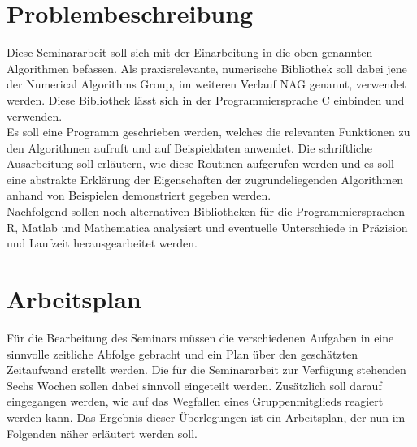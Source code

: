 \documentclass{article}
\begin{document}
\section{Problembeschreibung}
Diese Seminararbeit soll sich mit der Einarbeitung in die oben genannten Algorithmen befassen.
Als praxisrelevante, numerische Bibliothek soll dabei jene der Numerical Algorithms Group, im weiteren Verlauf NAG genannt, verwendet werden. Diese Bibliothek lässt sich in der Programmiersprache C einbinden und verwenden.\\
Es soll eine Programm geschrieben werden, welches die relevanten Funktionen zu den Algorithmen aufruft und auf Beispieldaten anwendet. Die schriftliche Ausarbeitung soll erläutern, wie diese Routinen aufgerufen werden und es soll eine abstrakte Erklärung der Eigenschaften der zugrundeliegenden Algorithmen anhand von Beispielen demonstriert gegeben werden.\\
Nachfolgend sollen noch alternativen Bibliotheken für die Programmiersprachen R, Matlab und Mathematica analysiert und eventuelle Unterschiede in Präzision und Laufzeit herausgearbeitet werden.

\section{Arbeitsplan}
Für die Bearbeitung des Seminars müssen die verschiedenen Aufgaben in eine sinnvolle zeitliche Abfolge gebracht und ein Plan über den geschätzten Zeitaufwand erstellt werden.
Die für die Seminararbeit zur Verfügung stehenden Sechs Wochen sollen dabei sinnvoll eingeteilt werden.
Zusätzlich soll darauf eingegangen werden, wie auf das Wegfallen eines Gruppenmitglieds reagiert werden kann.
Das Ergebnis dieser Überlegungen ist ein Arbeitsplan, der nun im Folgenden näher erläutert werden soll.
\end{document}

